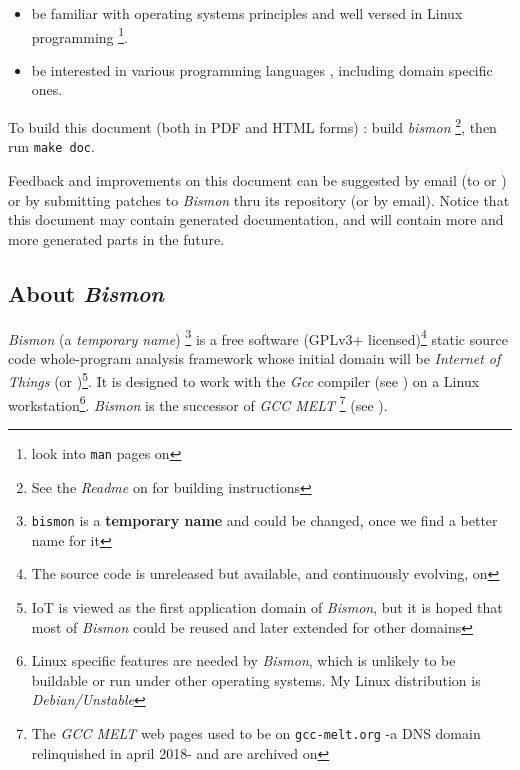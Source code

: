 \begin{itemize}
\item be familiar with operating systems principles
  \cite{Tanenbaum:92:OS,ArpaciDusseau14-Book} and well
  versed in Linux programming
  \cite{Mitchell:2001:ALP,Kerrisk:2010:LinuxProgramming} \footnote{look
    into \texttt{man} pages on
    }.

  \item be interested in various programming languages
    \cite{Abelson1996:SICP,Scott:2007:PLP,Queinnec:1996:LSP},
    including domain specific ones.

\end{itemize}


To build this document (both in PDF and HTML forms) : build
\emph{bismon} \footnote{See the \emph{Readme} on
   for building
  instructions}, then run \texttt{make doc}.

Feedback and improvements on this document can be suggested by email
(to  or
) or by submitting patches to
\textit{Bismon} thru its  repository
(or by email). Notice that this document may contain generated
documentation, and will contain more and more generated parts in the
future.

\subsection{About \textit{Bismon}}

\textit{Bismon} (a \emph{temporary name}) \footnote{\texttt{bismon} is a \textbf{temporary name}
  and could be changed, once we find a better name for it} is a free
software (GPLv3+ licensed)\footnote{The source code is unreleased but available, and continuously evolving, on } static source code whole-program analysis framework whose
initial domain will be \emph{Internet of Things} (or
)\footnote{IoT is viewed as the first application
  domain of \textit{Bismon}, but it is hoped that most of
  \textit{Bismon} could be reused and later extended for other
  domains}. It is designed to work with the \textit{Gcc} compiler (see
) on a Linux workstation\footnote{Linux specific features are needed by \textit{Bismon}, which is unlikely to be buildable or run under other operating systems. My Linux distribution is \emph{Debian/Unstable}}. \textit{Bismon} is the
successor of \textit{GCC MELT} \footnote{The \textit{GCC MELT} web
  pages used to be on \texttt{gcc-melt.org} -a DNS domain relinquished
  in april 2018- and are archived on
  } (see \cite{Starynkevitch2007Multistage, starynkevitch-DSL2011}).

